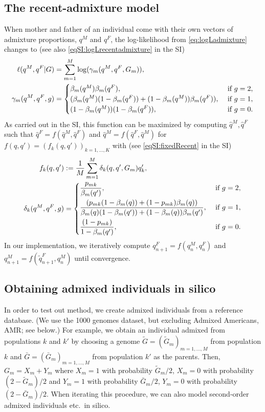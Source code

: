 \documentclass[12pt]{article}
\theoremstyle{definition}
\begin{document}
\subsection{The recent-admixture model}
When mother and father of an individual come with their own vectors of
admixture proportions, $q^M$ and $q^F$, the log-likelihood from
\eqref{eq:logLadmixture} changes to (see also
\eqref{eqSI:logLrecentadmixture} in the SI)
\begin{align}\label{eq:logLrecentadmixture}
  \ell(q^M, q^F|G) & = \sum_{m=1}^M \log( \gamma_m(q^M, q^F, G_m)),
  \\
  \notag
  \gamma_m(q^M, q^F, g) & = \begin{cases}\beta_m(q^M) \beta_m(q^F), & \text{ if }g=2,\\
    (\beta_m(q^M) (1-\beta_m(q^F))
    + (1-\beta_m(q^M)) \beta_m(q^F)), & \text{ if }g=1,\\
    (1-\beta_m(q^M))(1-\beta_m(q^F)), & \text{ if }g=0. \end{cases}
\end{align}
\sloppy As carried out in the SI, this function can be maximized by
computing $\hat q^M, \hat q^F$ such that
$\hat q^F = f(\hat q^M, \hat q^F)$ and
$\hat q^M = f(\hat q^F, \hat q^M)$ for
$f(q,q') = (f_k(q, q'))_{k=1,...,K}$ with (see
\eqref{eqSI:fixedRecent} in the SI)
\begin{align}\label{eq:fixedRecent}
  f_k(q, q') & := \frac{1}{M}\sum_{m=1}^M \delta_k(q,q', G_m) q_k',
  \\
  \notag
  \delta_k(q^M, q^F, g) & = \begin{cases}
    \displaystyle\frac{p_{mk}}{\beta_m(q')}, & \text{ if }g=2,\\[2ex]
    \displaystyle\frac{(p_{mk} (1-\beta_m(q))
      + (1-p_{mk})\beta_m(q))}{\beta_m(q)(1-\beta_m(q'))
      + (1-\beta_m(q))\beta_m(q')}, & \text{ if }g=1,\\[2ex]
    \displaystyle\frac{(1-p_{mk})}{1-\beta_m(q')}, & \text{ if }g=0. \end{cases}
\end{align}
In our implementation, we iteratively compute
$q_{n+1}^F = f(q_n^M, q_n^F)$ and
$q_{n+1}^M = f(\tilde q_{n+1}^F, q_n^M)$ until convergence.

\subsection{Obtaining admixed individuals in silico}
In order to test out method, we create admixed individuals from a
reference database. (We use the 1000 genomes dataset, but excluding
Admixed Americans, AMR; see below.) For example, we obtain an
individual admixed from populations $k$ and $k'$ by choosing a genome
$\tilde G = (\tilde G_m)_{m=1,...,M}$ from population $k$ and
$\bar G = (\bar G_m)_{m=1,...,M}$ from population $k'$ as the
parents. Then, $G_m = X_m + Y_m$ where $X_m = 1$ with probability
$\tilde G_m/2$, $X_m=0$ with probability $(2-\tilde G_m)/2$ and
$Y_m = 1$ with probability $\bar G_m/2$, $Y_m=0$ with probability
$(2-\bar G_m)/2$. When iterating this procedure, we can also model
second-order admixed individuals etc.\ in silico.
\end{document}
